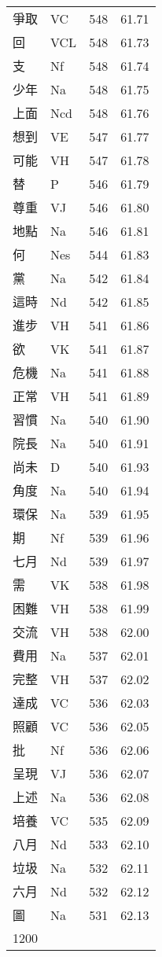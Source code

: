 \documentclass[twocolumn]{book}
\begin{document}
\begin{supertabular}{llrr}
爭取 & VC & 548 &  61.71\\
回 & VCL & 548 &  61.73\\
支 & Nf & 548 &  61.74\\
少年 & Na & 548 &  61.75\\
上面 & Ncd & 548 &  61.76\\
想到 & VE & 547 &  61.77\\
可能 & VH & 547 &  61.78\\
替 & P & 546 &  61.79\\
尊重 & VJ & 546 &  61.80\\
地點 & Na & 546 &  61.81\\
何 & Nes & 544 &  61.83\\
黨 & Na & 542 &  61.84\\
這時 & Nd & 542 &  61.85\\
進步 & VH & 541 &  61.86\\
欲 & VK & 541 &  61.87\\
危機 & Na & 541 &  61.88\\
正常 & VH & 541 &  61.89\\
習慣 & Na & 540 &  61.90\\
院長 & Na & 540 &  61.91\\
尚未 & D & 540 &  61.93\\
角度 & Na & 540 &  61.94\\
環保 & Na & 539 &  61.95\\
期 & Nf & 539 &  61.96\\
七月 & Nd & 539 &  61.97\\
需 & VK & 538 &  61.98\\
困難 & VH & 538 &  61.99\\
交流 & VH & 538 &  62.00\\
費用 & Na & 537 &  62.01\\
完整 & VH & 537 &  62.02\\
達成 & VC & 536 &  62.03\\
照顧 & VC & 536 &  62.05\\
批 & Nf & 536 &  62.06\\
呈現 & VJ & 536 &  62.07\\
上述 & Na & 536 &  62.08\\
培養 & VC & 535 &  62.09\\
八月 & Nd & 533 &  62.10\\
垃圾 & Na & 532 &  62.11\\
六月 & Nd & 532 &  62.12\\
圖 & Na & 531 &  62.13\\
1200\\

\end{supertabular}
\end{document}
